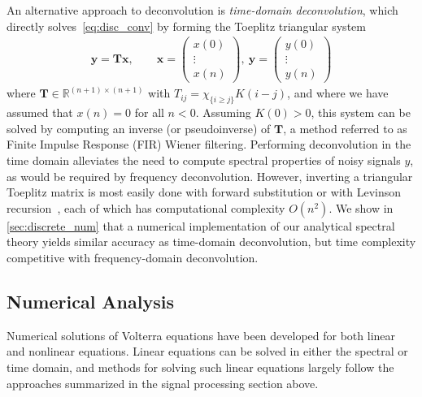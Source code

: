 \documentclass{cams-l} %
\newcommand{\dave}[1]{#1}\newcommand{\davebegin}{}\newcommand{\daveend}{}\newcommand{\george}[1]{#1}
\newcommand{\RR}{\mathbb R}
\theoremstyle{definition}
\theoremstyle{remark}
\numberwithin{equation}{section}
\begin{document}
An alternative approach to deconvolution is \textit{time-domain deconvolution}, which directly solves~\eqref{eq:disc_conv} by forming the Toeplitz triangular system
\begin{align*}
    \mathbf{y} = \mathbf{T}\mathbf{x}, \qquad \mathbf{x} = \begin{pmatrix}x(0)\\ \vdots\\ x(n)\end{pmatrix}, \ \mathbf{y} = \begin{pmatrix}y(0)\\ \vdots\\ y(n)\end{pmatrix}
\end{align*}
where $\mathbf{T} \in \RR^{(n+1) \times (n+1)}$ with $T_{ij} = \chi_{\{i \geq j\}}K(i-j)$, and where we have assumed that $x(n) = 0$ for all $n < 0$. Assuming $K(0) > 0$, this system can be solved by computing an inverse (or pseudoinverse) of $\mathbf{T}$, a method referred to as Finite Impulse Response (FIR) Wiener filtering. Performing deconvolution in the time domain alleviates the need to compute spectral properties of noisy signals $y$, as would be required by frequency deconvolution. However, inverting a triangular Toeplitz matrix is most easily done with forward substitution or with Levinson recursion~\cite{wiener1964wiener}, each of which has computational complexity $O(n^2)$. We show in \cref{sec:discrete_num} that \dave{a numerical implementation of our analytical spectral theory yields similar accuracy as time-domain deconvolution, but time complexity competitive with frequency-domain deconvolution}.%

\subsection{Numerical Analysis}
Numerical solutions of Volterra equations have been developed for both linear and nonlinear equations. Linear equations can be solved in either the spectral or time domain, and methods for solving such linear equations largely follow the approaches summarized in the signal processing section above.
\end{document}
